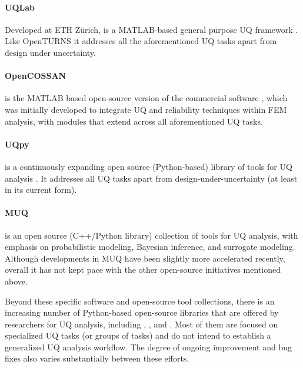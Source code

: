 \paragraph{UQLab} Developed at ETH Zürich,  is a MATLAB-based general purpose UQ framework \citep{marelli2014uqlab}. Like OpenTURNS it addresses all the aforementioned UQ tasks apart from design under uncertainty. 

\paragraph{OpenCOSSAN} 
 is the MATLAB based open-source version of the commercial software  \citep{patelli2017cossan}, which was initially developed to integrate UQ and reliability techniques within FEM analysis, with modules that extend across all aforementioned UQ tasks.

\paragraph{UQpy}  is a continuously expanding open source (Python-based) library of tools for UQ analysis \citep{olivier2020uqpy}. It addresses all UQ tasks apart from design-under-uncertainty (at least in its current form).

\paragraph{MUQ} 
 is an open source (C++/Python library) collection of tools for UQ analysis, with emphasis on probabilistic modeling, Bayesian inference, and surrogate modeling. Although developments in MUQ have been slightly more accelerated recently, overall it has not kept pace with the other open-source initiatives mentioned above.


Beyond these specific software and open-source tool collections, there is an increasing number of Python-based open-source libraries that are offered by researchers for UQ analysis, including , , and . Most of them are focused on specialized UQ tasks (or groups of tasks) and do not intend to establish a generalized UQ analysis workflow. The degree of ongoing improvement and bug fixes also varies substantially between these efforts.
